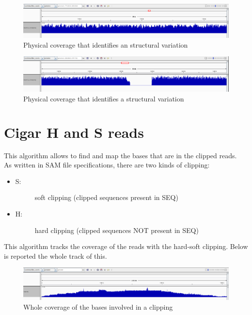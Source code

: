  \begin{figure}[H]
				\centering
				\includegraphics[scale=0.6]{immagini/sequence_coverage_2.png}
				\caption{Physical coverage that identifies an structural variation}\label{fig:10}
				\end{figure}
				
				
				
 \begin{figure}[H]
				\centering
				\includegraphics[scale=0.6]{immagini/sequence_coverage_3.png}
				\caption{Physical coverage that identifies a structural variation}\label{fig:11}
				\end{figure}	
				
				

\section{Cigar H and S reads}
\label{sec:cigar}
This algorithm allows to find and map the bases that are in the clipped reads.\\
As written in SAM file specifications, there are two kinds of clipping:

\begin{itemize}
\item \begin{description}
		\item[S:] soft clipping (clipped sequences present in SEQ)
  \end{description}
\end{itemize}

\begin{itemize}
\item \begin{description}
		\item[H:] hard clipping (clipped sequences NOT present in SEQ)
  \end{description}
\end{itemize}


This algorithm tracks the coverage of the reads with the hard-soft clipping. Below is reported the whole track of this.
 \begin{figure}[H]
				\centering
				\includegraphics[scale=0.45]{immagini/cigar_coverage_1.png}
				\caption{Whole coverage of the bases involved in a clipping}\label{fig:15}
				\end{figure}	
				
